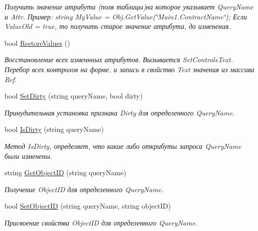 \begin{DoxyCompactItemize}
\begin{DoxyCompactList}\small\item\em Получить значение атрибута (поля таблицы)на которое указывает Query\+Name и Attr. Пример\+: string My\+Value = Obj.\+Get\+Value(\char`\"{}\+Main1.\+Contract\+Name\char`\"{}); Если Value\+Old = true, то получить старое значение атрибута, до изменения. \end{DoxyCompactList}\item 
bool \mbox{\hyperlink{class_f_b_a_1_1_object_ref_afbcae956ef25b55b2f27be15cd48922d}{Restore\+Values}} ()
\begin{DoxyCompactList}\small\item\em Восстановление всех изменнных атрибутов. Вызывается Set\+Controls\+Text. Перебор всех контролов на форме, и запись в свойство Text значения из массива Ref. ~\newline
\end{DoxyCompactList}\item 
bool \mbox{\hyperlink{class_f_b_a_1_1_object_ref_acf05bfdc57a547fb141b8989a264232f}{Set\+Dirty}} (string query\+Name, bool dirty)
\begin{DoxyCompactList}\small\item\em Принудительная установка признака Dirty для определенного Query\+Name. \end{DoxyCompactList}\item 
bool \mbox{\hyperlink{class_f_b_a_1_1_object_ref_a5959707cbde92b477ecaab82c2c5f29c}{Is\+Dirty}} (string query\+Name)
\begin{DoxyCompactList}\small\item\em Метод Is\+Dirty, определяет, что какие либо открибуты запроса Query\+Name были изменены. ~\newline
\end{DoxyCompactList}\item 
string \mbox{\hyperlink{class_f_b_a_1_1_object_ref_aa362a5126d87e79b5009257e6bd0bce2}{Get\+Object\+ID}} (string query\+Name)
\begin{DoxyCompactList}\small\item\em Получение Object\+ID для определенного Query\+Name. \end{DoxyCompactList}\item 
bool \mbox{\hyperlink{class_f_b_a_1_1_object_ref_a2d131ae4fda915ff9179cc02e30c76d8}{Set\+Object\+ID}} (string query\+Name, string object\+ID)
\begin{DoxyCompactList}\small\item\em Присвоение свойства Object\+ID для определенного Query\+Name. \end{DoxyCompactList}\item 

\end{DoxyCompactItemize}
